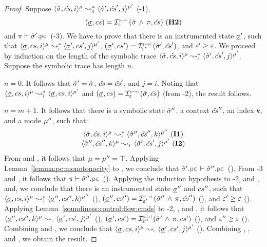 \begin{proof}

Suppose $\transabssemrule{\sstate, \scs, i}{\sstate', \scs', j}{\mode}{\mode'}{\symbolic}$ (\hyp{1}), 
$$(\istate, \cs) = \interpret{\symbinst}{\senv}(\sstate \, \wedge \, \pc, \scs) \text{ (\hyp{2})}$$ and 
$\pc \vdash \sstate'.\pcsel$ (\hyp{3}). 
We have to prove that there is an instrumented state $\underline{\sigma}'$,
such that $\transabssemrule{\istate, \cs, i}{\istate', \cs', j}{\mode}{\mode'}{\instrumented}$, 
$(\istate', \cs') = \interpret{\symbinst}{\senv'}(\sstate', \scs')$, and $\varepsilon' \geq  \varepsilon$.
We proceed by induction on the length of the symbolic trace 
 $\transabssemrule{\sstate, \scs, i}{\sstate', \scs', j}{\mode}{\mode'}{\symbolic}$. 
Suppose the symbolic trace has length $n$. 
\vspace{6pt}

\noindent {} $n = 0$. It follows that $\hat{\sigma}' = \hat{\sigma}$, 
$\hat{cs} = \hat{cs}'$, and $j = i$. Noting that 
$\transabssemrule{\istate, \cs, i}{\istate, \cs, i}{\mode}{\mode'}{\instrumented}$
and 
$(\istate, \cs) = \interpret{\symbinst}{\senv}(\sstate, \scs)$ (from \hyp{2}), 
the result follows. 
\vspace{6pt}


\noindent {} $n = m + 1$. It follows that there is a symbolic state 
$\hat{\sigma}''$, a context $\hat{cs}''$, an index $k$, and a mode $\mu''$, such that: 
$$
\begin{array}{c}
\transabssemrule{\sstate, \scs, i}{\sstate'', \scs'', k}{\mode}{\mode''}{\symbolic} \text{ (\ieq{1})} \\ 
\abssemrule{\sstate'', \scs'', k}{\sstate', \scs', j}{\mode}{\mode'}{\symbolic} \text{ (\ieq{2})}
\end{array}
$$
From  and , it follows that $\mu = \mu'' = \top$. 
Applying Lemma~\ref{lemma:pc:monotonocity} to , we conclude that $\sstate'.\pcsel \vdash \sstate''.\pcsel$ (). 
From \hyp{3} and , it follows that $\pc \vdash \sstate''.\pcsel$ (). 
Applying the induction hypothesis to \hyp{2},  and , and, we conclude that 
there is an instrumented state $\underline{\sigma}''$ and $cs''$, such that
$\transabssemrule{\istate, \cs, i}{\istate'', \cs'', k}{\mode}{\mode''}{\instrumented}$ (), 
$(\istate'', \cs'') = \interpret{\symbinst}{\senv'}(\sstate'' \, \wedge \, \pc, \scs'')$ (), and 
$\varepsilon' \geq  \varepsilon$ (). 
Applying Lemma~\ref{soundiness:control:flow:cmds} to \hyp{2}, , and ,
it follows that  
$\abssemrule{\istate'', \cs'', k}{\istate', \cs', j}{\mode}{\mode'}{\instrumented}$ (), 
$(\istate', \cs') = \interpret{\symbinst}{\senv''}(\sstate' \, \wedge \, \pc, \cs')$ (), and 
$\varepsilon'' \geq  \varepsilon$ (). 
Combining  and , we conclude that 
$\abssemrule{\istate, \cs, i}{\istate', \cs', j}{\mode}{\mode'}{\instrumented}$ (). 
Combining , , and , we obtain the result. 
\end{proof}

